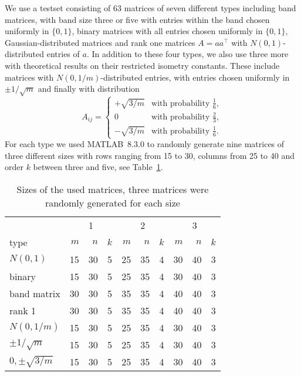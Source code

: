 \documentclass[journal]{IEEEtran}
\newcommand{\T}{^{\top}}
\begin{document}
We use a testset consisting of 63 matrices of seven 
different types including band matrices, 
with band size three or five with entries within the band chosen uniformly in $\{0,1\}$, binary matrices with all entries chosen 
uniformly in $\{0,1\}$, Gaussian-distributed matrices and rank one 
matrices $A = aa\T$ with $N(0,1)$-distributed entries of $a$. In addition to these four types,
we also use three more with theoretical results on their restricted isometry
constants. These include matrices with 
$N(0, 1/m)$-distributed entries, with entries chosen uniformly in $\pm 1/\sqrt{m}$ and finally with distribution
\begin{equation}\nonumber
  A_{ij} = \begin{cases}
    + \sqrt{3/m} & \text{with probability } \frac{1}{6}, \\
    0 & \text{with probability } \frac{2}{3}, \\
    - \sqrt{3/m} & \text{with probability } \frac{1}{6}.
  \end{cases}
\end{equation}
For each type we used \mbox{MATLAB 8.3.0} to randomly generate nine
matrices of three different sizes with rows ranging from 15 to 30, columns
from 25 to 40 and order $k$ between three and five, see Table~\ref{matrixsizes}.

\begin{table} 
 \begin{scriptsize} \caption{Sizes of the used matrices, three matrices were
 randomly generated for each size} 
 \label{matrixsizes} 
 \begin{tabular*}{\linewidth}{@{}l@{\;\;\extracolsep{\fill}}rrrrrrrrr@{}}\toprule 
  & \multicolumn{3}{c}{1} & \multicolumn{3}{c}{2} & \multicolumn{3}{c}{3} \\ 
\cmidrule(r){2-4} \cmidrule{5-7}  \cmidrule(l){8-10}
type & $m$ & $n$ & $k$ & $m$ & $n$ & $k$ & $m$ & $n$ & $k$  \\ 
\midrule 
$N(0,1)$ & 15 & 30 & 5 & 25 & 35 & 4 & 30 & 40 & 3 \\
binary & 15 & 30 & 5 & 25 & 35 & 4 & 30 & 40 & 3 \\
band matrix & 30 & 30 & 5 & 35 & 35 & 4 & 40 & 40 & 3 \\
rank 1& 30 & 30 & 5 & 35 & 35 & 4 & 40 & 40 & 3 \\
$N(0,1/m)$ & 15 & 30 & 5 & 25 & 35 & 4 & 30 & 40 & 3 \\
$\pm 1/\sqrt{m}$ & 15 & 30 & 5 & 25 & 35 & 4 & 30 & 40 & 3 \\
$0, \pm \sqrt{3/m}$ & 15 & 30 & 5 & 25 & 35 & 4 & 30 & 40 & 3 \\
\bottomrule 
 \end{tabular*} 
 \end{scriptsize} 
 \end{table} 
\end{document}
